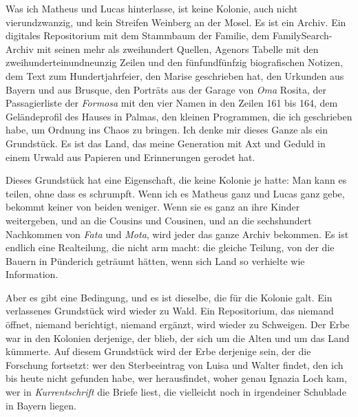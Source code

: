 \documentclass[
  ngerman,
  11pt,
  openany]{book}
\begin{document}
Was ich Matheus und Lucas hinterlasse, ist keine Kolonie, auch nicht
vierundzwanzig, und kein Streifen Weinberg an der Mosel. Es ist ein
Archiv. Ein digitales Repositorium mit dem Stammbaum der Familie, dem
FamilySearch-Archiv mit seinen mehr als zweihundert Quellen, Agenors
Tabelle mit den zweihunderteinundneunzig Zeilen und den fünfundfünfzig
biografischen Notizen, dem Text zum Hundertjahrfeier, den Marise
geschrieben hat, den Urkunden aus Bayern und aus Brusque, den Porträts
aus der Garage von \emph{Oma} Rosita, der Passagierliste der
\emph{Formosa} mit den vier Namen in den Zeilen 161 bis 164, dem
Geländeprofil des Hauses in Palmas, den kleinen Programmen, die ich
geschrieben habe, um Ordnung ins Chaos zu bringen. Ich denke mir dieses
Ganze als ein Grundstück. Es ist das Land, das meine Generation mit Axt
und Geduld in einem Urwald aus Papieren und Erinnerungen gerodet hat.

Dieses Grundstück hat eine Eigenschaft, die keine Kolonie je hatte: Man
kann es teilen, ohne dass es schrumpft. Wenn ich es Matheus ganz und
Lucas ganz gebe, bekommt keiner von beiden weniger. Wenn sie es ganz an
ihre Kinder weitergeben, und an die Cousins und Cousinen, und an die
sechshundert Nachkommen von \emph{Fata} und \emph{Mota}, wird jeder das
ganze Archiv bekommen. Es ist endlich eine Realteilung, die nicht arm
macht: die gleiche Teilung, von der die Bauern in Pünderich geträumt
hätten, wenn sich Land so verhielte wie Information.

Aber es gibt eine Bedingung, und es ist dieselbe, die für die Kolonie
galt. Ein verlassenes Grundstück wird wieder zu Wald. Ein Repositorium,
das niemand öffnet, niemand berichtigt, niemand ergänzt, wird wieder zu
Schweigen. Der Erbe war in den Kolonien derjenige, der blieb, der sich
um die Alten und um das Land kümmerte. Auf diesem Grundstück wird der
Erbe derjenige sein, der die Forschung fortsetzt: wer den Sterbeeintrag
von Luisa und Walter findet, den ich bis heute nicht gefunden habe, wer
herausfindet, woher genau Ignazia Loch kam, wer in \emph{Kurrentschrift}
die Briefe liest, die vielleicht noch in irgendeiner Schublade in Bayern
liegen.
\end{document}
